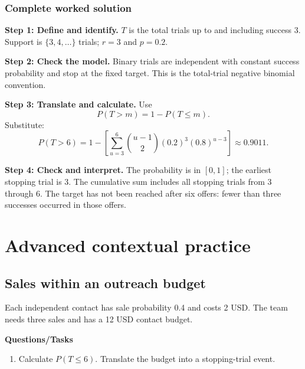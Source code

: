 \subsubsection*{Complete worked solution}
\par\noindent\begin{minipage}{\linewidth}
\textbf{Step 1: Define and identify.} $T$ is the total trials up to and including success 3. Support is $\{3,4,\ldots\}$ trials; $r=3$ and $p=0.2$.
\end{minipage}\par\medskip
\par\noindent\begin{minipage}{\linewidth}
\textbf{Step 2: Check the model.} Binary trials are independent with constant success probability and stop at the fixed target. This is the total-trial negative binomial convention.
\end{minipage}\par\medskip
\par\noindent\begin{minipage}{\linewidth}
\textbf{Step 3: Translate and calculate.} Use
\[P(T>m)=1-P(T\leq m).\]
Substitute:
\[P(T>6)=1-\left[\sum_{u=3}^{6}\binom{u-1}{2}(0.2)^3(0.8)^{u-3}\right]\approx 0.9011.\]
\end{minipage}\par\medskip
\par\noindent\begin{minipage}{\linewidth}
\textbf{Step 4: Check and interpret.} The probability is in $[0,1]$; the earliest stopping trial is 3. The cumulative sum includes all stopping trials from 3 through 6. The target has not been reached after six offers: fewer than three successes occurred in those offers.
\end{minipage}\par\medskip
{}
\section{Advanced contextual practice}\label{sec:t2-c6-advanced}
\subsection{Sales within an outreach budget}
Each independent contact has sale probability 0.4 and costs 2 USD. The team needs three sales and has a 12 USD contact budget.

\textbf{Questions/Tasks}
\begin{enumerate}
\item Calculate $P(T\leq6)$. Translate the budget into a stopping-trial event.
\end{enumerate}
